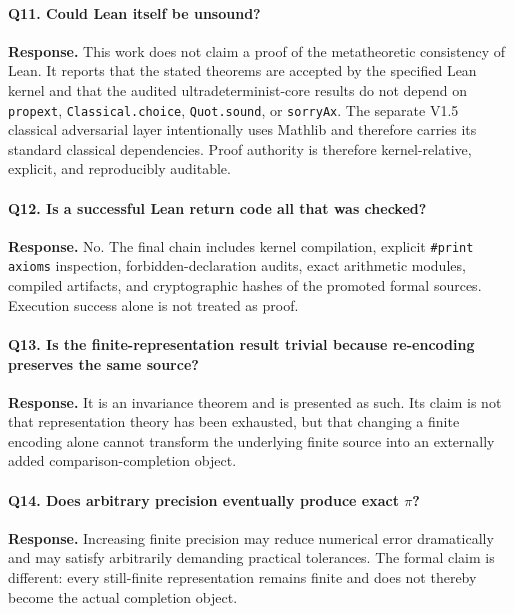 \documentclass[11pt,a4paper]{article}
\begin{document}
\paragraph{Q11. Could Lean itself be unsound?}

\textbf{Response.}
This work does not claim a proof of the metatheoretic consistency of
Lean. It reports that the stated theorems are accepted by the specified
Lean kernel and that the audited ultradeterminist-core results do not depend on
\texttt{propext}, \texttt{Classical.choice}, \texttt{Quot.sound}, or
\texttt{sorryAx}.  The separate V1.5 classical adversarial layer
intentionally uses Mathlib and therefore carries its standard
classical dependencies. Proof authority is therefore kernel-relative,
explicit, and reproducibly auditable.

\paragraph{Q12. Is a successful Lean return code all that was checked?}

\textbf{Response.}
No. The final chain includes kernel compilation, explicit
\texttt{\#print axioms} inspection, forbidden-declaration audits,
exact arithmetic modules, compiled artifacts, and cryptographic hashes
of the promoted formal sources. Execution success alone is not treated
as proof.

\paragraph{Q13. Is the finite-representation result trivial because re-encoding preserves the same source?}

\textbf{Response.}
It is an invariance theorem and is presented as such. Its claim is not
that representation theory has been exhausted, but that changing a
finite encoding alone cannot transform the underlying finite source
into an externally added comparison-completion object.

\paragraph{Q14. Does arbitrary precision eventually produce exact \(\pi\)?}

\textbf{Response.}
Increasing finite precision may reduce numerical error dramatically and
may satisfy arbitrarily demanding practical tolerances. The formal
claim is different: every still-finite representation remains finite
and does not thereby become the actual completion object.
\end{document}
